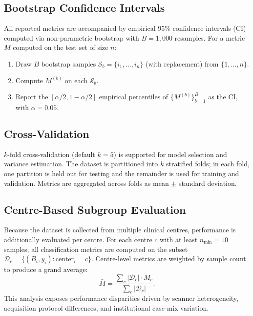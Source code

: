 \documentclass[11pt,a4paper]{article}
\begin{document}
\subsection{Bootstrap Confidence Intervals}

All reported metrics are accompanied by empirical 95\% confidence intervals (CI)
computed via non-parametric bootstrap with $B = 1{,}000$ resamples. For a metric
$M$ computed on the test set of size $n$:
\begin{enumerate}
  \item Draw $B$ bootstrap samples $\mathcal{S}_b = \{i_1, \ldots, i_n\}$
        (with replacement) from $\{1, \ldots, n\}$.
  \item Compute $M^{(b)}$ on each $\mathcal{S}_b$.
  \item Report the $[\alpha/2, 1-\alpha/2]$ empirical percentiles of
        $\{M^{(b)}\}_{b=1}^{B}$ as the CI, with $\alpha = 0.05$.
\end{enumerate}

\subsection{Cross-Validation}

$k$-fold cross-validation (default $k = 5$) is supported for model selection and
variance estimation. The dataset is partitioned into $k$ stratified folds;
in each fold, one partition is held out for testing and the remainder is used for
training and validation. Metrics are aggregated across folds as mean $\pm$ standard
deviation.

\subsection{Centre-Based Subgroup Evaluation}

Because the dataset is collected from multiple clinical centres, performance is
additionally evaluated per centre. For each centre $c$ with at least
$n_{\min} = 10$ samples, all classification metrics are computed on the subset
$\mathcal{D}_c = \{(B_i, y_i) : \text{center}_i = c\}$. Centre-level metrics
are weighted by sample count to produce a grand average:
\begin{equation}
  \bar{M} = \frac{\sum_c |\mathcal{D}_c| \cdot M_c}{\sum_c |\mathcal{D}_c|}.
\end{equation}
This analysis exposes performance disparities driven by scanner heterogeneity,
acquisition protocol differences, and institutional case-mix variation.
\end{document}
